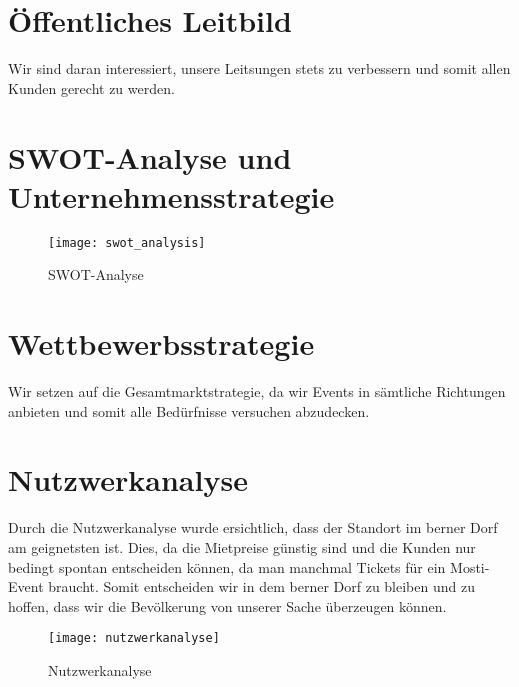 \documentclass[a4paper, titlepage]{article}
\begin{document}
\section{Öffentliches Leitbild}
Wir sind daran interessiert, unsere Leitsungen stets zu verbessern und somit allen Kunden gerecht zu werden.
\section{SWOT-Analyse und Unternehmensstrategie}
\begin{figure}[H]
  \texttt{[image: swot\_analysis]}
  \caption{SWOT-Analyse}
\end{figure}


\section{Wettbewerbsstrategie}
Wir setzen auf die Gesamtmarktstrategie, da wir Events in sämtliche Richtungen anbieten und somit alle Bedürfnisse versuchen abzudecken.

\section{Nutzwerkanalyse}
Durch die Nutzwerkanalyse wurde ersichtlich, dass der Standort im berner Dorf am geignetsten ist. 
Dies, da die Mietpreise günstig sind und die Kunden nur bedingt spontan entscheiden können, da man manchmal Tickets für ein Mosti-Event braucht.
Somit entscheiden wir in dem berner Dorf zu bleiben und zu hoffen, dass wir die Bevölkerung von unserer Sache überzeugen können.

\begin{figure}[h]
  \texttt{[image: nutzwerkanalyse]}
  \caption{Nutzwerkanalyse}
\end{figure}
\end{document}
